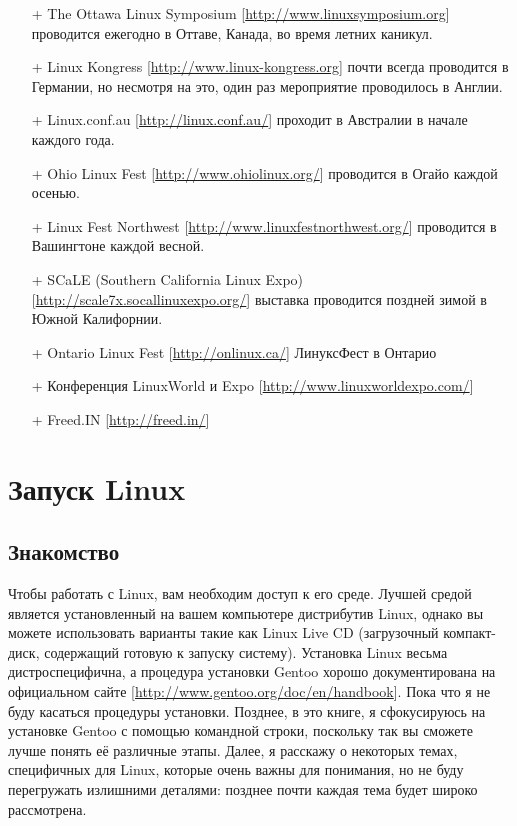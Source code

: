 \documentclass[10pt]{book}
\begin{document}
\phantom{}
\begin{tcolorbox}[title=\textbf{Дальнейшие ресурсы}, colback=yellow!14!white, colframe=red!75!blue]
\begin{itemize}
	\item[+] The Ottawa Linux Symposium [\href{http://www.linuxsymposium.org}{http://www.linuxsymposium.org}] проводится ежегодно в Оттаве, Канада, во время летних каникул.
	\item[+] Linux Kongress [\href{http://www.linux-kongress.org}{http://www.linux-kongress.org}] почти всегда проводится в Германии, но несмотря на это, один раз мероприятие проводилось в Англии.
	\item[+] Linux.conf.au [\href{http://linux.conf.au/}{http://linux.conf.au/}] проходит в Австралии в начале каждого года.
	\item[+] Ohio Linux Fest [\href{http://www.ohiolinux.org/}{http://www.ohiolinux.org/}] проводится в Огайо каждой осенью.
	\item[+] Linux Fest Northwest [\href{http://www.linuxfestnorthwest.org/}{http://www.linuxfestnorthwest.org/}] проводится в Вашингтоне каждой весной.
	\item[+] SCaLE (Southern California Linux Expo) [\href{http://scale7x.socallinuxexpo.org/}{http://scale7x.socallinuxexpo.org/}] выставка проводится поздней зимой в Южной Калифорнии.
	\item[+] Ontario Linux Fest [\href{http://onlinux.ca/}{http://onlinux.ca/}] ЛинуксФест в Онтарио
	\item[+] Конференция LinuxWorld и Expo [\href{http://www.linuxworldexpo.com/}{http://www.linuxworldexpo.com/}]
	\item[+] Freed.IN [\href{http://freed.in/}{http://freed.in/}]
\end{itemize}
\end{tcolorbox}

\newpage


\chapter{Запуск Linux}

\section*{Знакомство}

Чтобы работать с Linux, вам необходим доступ к его среде. Лучшей средой является установленный на вашем компьютере дистрибутив Linux, однако вы можете использовать варианты такие как Linux Live CD (загрузочный компакт-диск, содержащий готовую к запуску систему). Установка Linux весьма дистроспецифична, а процедура установки Gentoo хорошо документирована на официальном сайте [\href{http://www.gentoo.org/doc/en/handbook}{http://www.gentoo.org/doc/en/handbook}]. Пока что я не буду касаться процедуры установки. Позднее, в это книге, я сфокусируюсь на установке Gentoo с помощью командной строки, поскольку так вы сможете лучше понять её различные этапы. Далее, я расскажу о некоторых темах, специфичных для Linux, которые очень важны для понимания, но не буду перегружать излишними деталями: позднее почти каждая тема будет широко рассмотрена.
\end{document}

